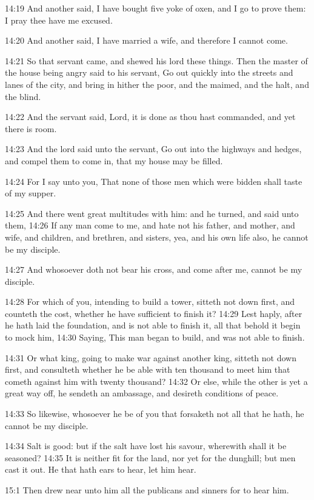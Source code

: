 14:19 And another said, I have bought five yoke of oxen, and I go to
prove them: I pray thee have me excused.

14:20 And another said, I have married a wife, and therefore I cannot
come.

14:21 So that servant came, and shewed his lord these things. Then the
master of the house being angry said to his servant, Go out quickly
into the streets and lanes of the city, and bring in hither the poor,
and the maimed, and the halt, and the blind.

14:22 And the servant said, Lord, it is done as thou hast commanded,
and yet there is room.

14:23 And the lord said unto the servant, Go out into the highways and
hedges, and compel them to come in, that my house may be filled.

14:24 For I say unto you, That none of those men which were bidden
shall taste of my supper.

14:25 And there went great multitudes with him: and he turned, and
said unto them, 14:26 If any man come to me, and hate not his father,
and mother, and wife, and children, and brethren, and sisters, yea,
and his own life also, he cannot be my disciple.

14:27 And whosoever doth not bear his cross, and come after me, cannot
be my disciple.

14:28 For which of you, intending to build a tower, sitteth not down
first, and counteth the cost, whether he have sufficient to finish it?
14:29 Lest haply, after he hath laid the foundation, and is not able
to finish it, all that behold it begin to mock him, 14:30 Saying, This
man began to build, and was not able to finish.

14:31 Or what king, going to make war against another king, sitteth
not down first, and consulteth whether he be able with ten thousand to
meet him that cometh against him with twenty thousand?  14:32 Or else,
while the other is yet a great way off, he sendeth an ambassage, and
desireth conditions of peace.

14:33 So likewise, whosoever he be of you that forsaketh not all that
he hath, he cannot be my disciple.

14:34 Salt is good: but if the salt have lost his savour, wherewith
shall it be seasoned?  14:35 It is neither fit for the land, nor yet
for the dunghill; but men cast it out. He that hath ears to hear, let
him hear.

15:1 Then drew near unto him all the publicans and sinners for to hear
him.

